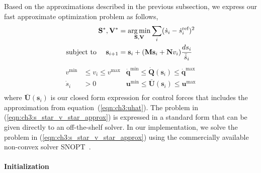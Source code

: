 Based on the approximations described in the previous subsection, we express our fast approximate optimization problem as follows, 
%
\begin{equation*}
\begin{aligned}
\mathbf{S}^{*},\mathbf{V}^{*} & = \operatorname*{arg\,min}_{\mathbf{S},\mathbf{V}} \sum_{i} ( \dot{s}_i - \dot{s}_i^{\text{ref}} )^{2} \\
\text{subject to~~~~}
\mathbf{s}_{i+1}              & =    \mathbf{s}_{i} + (\mathbf{M}\mathbf{s}_{i} + \mathbf{N}v_{i}) \frac{ds_i}{\bar{\dot{s}}_i} \\
\end{aligned}
\end{equation*}
%
\begin{equation}
\begin{aligned}
v^{\text{min}}  & \leq v_i \leq v^{\text{max}} & \dot{\mathbf{q}}^{\text{min}} \leq \dot{\mathbf{Q}}(\mathbf{s}_i) \leq \dot{\mathbf{q}}^{\text{max}} \\
\dot{s}_i       & > 0                                   & \mathbf{u}^{\text{min}}       \leq \bar{\mathbf{U}}(\mathbf{s}_i)       \leq \mathbf{u}^{\text{max}} \\
\end{aligned}
\label{eqn:ch3:s_star_v_star_approx}
\end{equation}
%
where $\bar{\mathbf{U}}(\mathbf{s}_i)$ is our closed form expression for control forces that includes the approximation from equation~(\ref{eqn:ch3:uhat}).
The problem in (\ref{eqn:ch3:s_star_v_star_approx}) is expressed in a standard form that can be given directly to an off-the-shelf solver.
In our implementation, we solve the problem in (\ref{eqn:ch3:s_star_v_star_approx}) using the commercially available non-convex solver SNOPT~\cite{gill:2002}.


\paragraph{Initialization}

